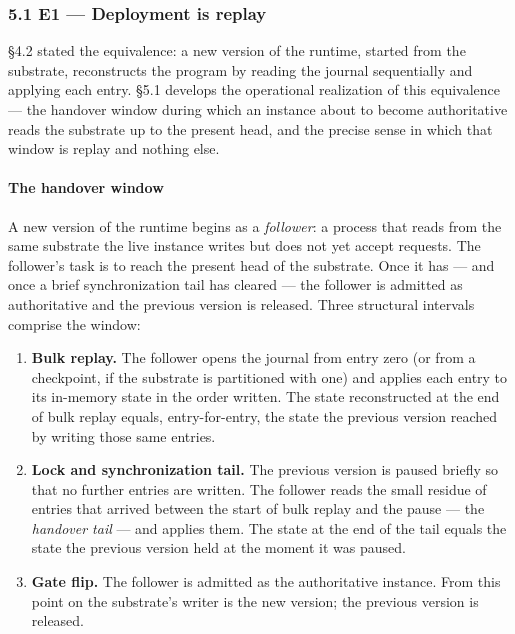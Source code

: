 \documentclass[
]{article}
\providecommand{\tightlist}{%
  \setlength{\itemsep}{0pt}\setlength{\parskip}{0pt}}
\begin{document}
\subsubsection{5.1 E1 --- Deployment is
replay}\label{e1-deployment-is-replay}

§4.2 stated the equivalence: a new version of the runtime, started from
the substrate, reconstructs the program by reading the journal
sequentially and applying each entry. §5.1 develops the operational
realization of this equivalence --- the handover window during which an
instance about to become authoritative reads the substrate up to the
present head, and the precise sense in which that window is replay and
nothing else.

\paragraph{The handover window}\label{the-handover-window}

A new version of the runtime begins as a \emph{follower}: a process that
reads from the same substrate the live instance writes but does not yet
accept requests. The follower's task is to reach the present head of the
substrate. Once it has --- and once a brief synchronization tail has
cleared --- the follower is admitted as authoritative and the previous
version is released. Three structural intervals comprise the window:

\begin{enumerate}
\def\labelenumi{\arabic{enumi}.}
\tightlist
\item
  \textbf{Bulk replay.} The follower opens the journal from entry zero
  (or from a checkpoint, if the substrate is partitioned with one) and
  applies each entry to its in-memory state in the order written. The
  state reconstructed at the end of bulk replay equals, entry-for-entry,
  the state the previous version reached by writing those same entries.
\item
  \textbf{Lock and synchronization tail.} The previous version is paused
  briefly so that no further entries are written. The follower reads the
  small residue of entries that arrived between the start of bulk replay
  and the pause --- the \emph{handover tail} --- and applies them. The
  state at the end of the tail equals the state the previous version
  held at the moment it was paused.
\item
  \textbf{Gate flip.} The follower is admitted as the authoritative
  instance. From this point on the substrate's writer is the new
  version; the previous version is released.
\end{enumerate}
\end{document}
